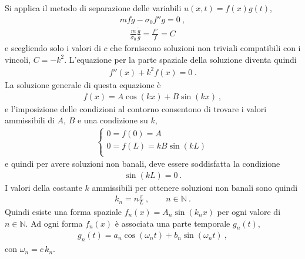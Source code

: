 \documentclass[letterpaper,10pt,italian]{jupyterBook}
\begin{document}
\sphinxAtStartPar
Si applica il metodo di separazione delle variabili \(u(x,t) = f(x) g(t)\),
\begin{equation*}
\begin{split}m f \ddot{g} - \sigma_0 f'' g = 0 \ ,\end{split}
\end{equation*}\begin{equation*}
\begin{split}\frac{m}{\sigma_0}\frac{\ddot{g}}{g} = \frac{f''}{f} = C\end{split}
\end{equation*}
\sphinxAtStartPar
e scegliendo solo i valori di \(c\) che forniscono soluzioni non triviali compatibili con i vincoli, \(C = - k^2\). L’equazione per la parte spaziale della soluzione diventa quindi
\begin{equation*}
\begin{split}f''(x) + k^2 f(x) = 0 \ .\end{split}
\end{equation*}
\sphinxAtStartPar
La soluzione generale di questa equazione è
\begin{equation*}
\begin{split}f(x) = A \cos (kx) + B \sin (kx) \ ,\end{split}
\end{equation*}
\sphinxAtStartPar
e l’imposizione delle condizioni al contorno consentono di trovare i valori ammissibili di \(A\), \(B\) e una condizione su \(k\),
\begin{equation*}
\begin{split}\begin{cases}
  0 = f(0) = A \\
  0 = f(L) = k B \sin (kL) \\
\end{cases}\end{split}
\end{equation*}
\sphinxAtStartPar
e quindi per avere soluzioni non banali, deve essere soddisfatta la condizione
\begin{equation*}
\begin{split}\sin(kL) = 0 \ .\end{split}
\end{equation*}
\sphinxAtStartPar
I valori della costante \(k\) ammissibili per ottenere soluzioni non banali sono quindi
\begin{equation*}
\begin{split}k_n = n \frac{\pi}{L} \ , \qquad n \in \mathbb{N} \ .\end{split}
\end{equation*}
\sphinxAtStartPar
Quindi esiste una forma spaziale \(f_n(x) = A_n \sin \left( k_n x \right)\) per ogni valore di \(n \in \mathbb{N}\). Ad ogni forma \(f_n(x)\) è associata una parte temporale \(g_n(t)\),
\begin{equation*}
\begin{split}g_n(t) = a_n \cos\left( \omega_n t \right) + b_n \sin\left( \omega_n t \right) \ ,\end{split}
\end{equation*}
\sphinxAtStartPar
con \(\omega_n = c \, k_n\).
\end{document}
